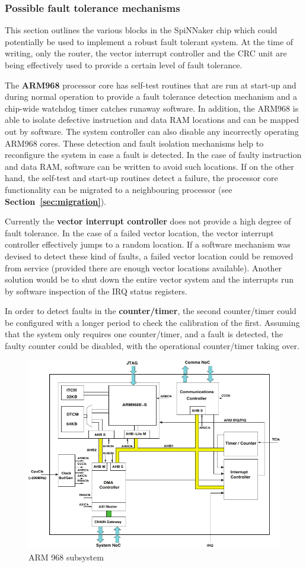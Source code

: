 \documentclass[a4paper, 11pt]{article}
\begin{document}
\subsubsection{Possible fault tolerance mechanisms}
This section outlines the various blocks in the SpiNNaker chip which could potentially be used to implement a robust fault tolerant system. At the time of writing, only the router, the vector interrupt controller and the CRC unit are being effectively used to provide a certain level of fault tolerance.

The \textbf{ARM968} processor core has self-test routines that are run at start-up and during normal operation to provide a fault tolerance detection mechanism and a chip-wide watchdog timer catches runaway software. In addition, the ARM968 is able to isolate defective instruction and data RAM locations and can be mapped out by software. The system controller can also disable any incorrectly operating ARM968 cores. These detection and fault isolation mechanisms help to reconfigure the system in case a fault is detected. In the case of faulty instruction and data RAM, software can be written to avoid such locations. If on the other hand, the self-test and start-up routines detect a failure, the processor core functionality can be migrated to a neighbouring processor (see \textbf{Section~\ref{sec:migration}}).

Currently the \textbf{vector interrupt controller} does not provide a high degree of fault tolerance. In the case of a failed vector location, the vector interrupt controller effectively jumps to a random location. If a software mechanism was devised to detect these kind of faults, a failed vector location could be removed from service (provided there are enough vector locations available). Another solution would be to shut down the entire vector system and the interrupts run by software inspection of the IRQ status registers.

In order to detect faults in the \textbf{counter/timer}, the second counter/timer could be configured with a longer period to check the calibration of the first. Assuming that the system only requires one counter/timer, and a fault is detected, the faulty counter could be disabled, with the operational counter/timer taking over.

\begin{figure}[t]
	\centering
	\includegraphics[width=0.7\linewidth]{images/arm968_subsystem.pdf}
	\caption{ARM 968 subsystem}
	\label{fig:arm968}
\end{figure}
\end{document}
